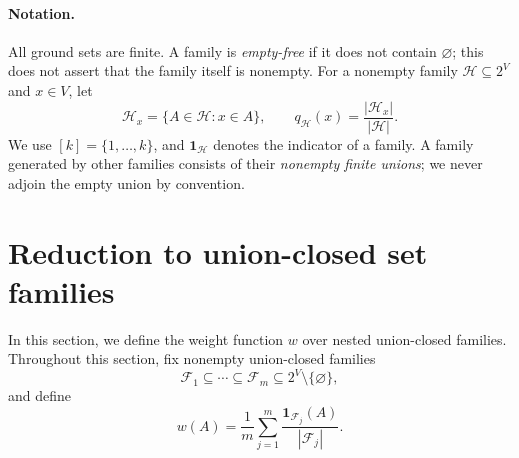 \documentclass[11pt]{article}
\newcommand{\<}{\langle}
\renewcommand{\>}{\rangle}
\newcommand{\F}{\mathcal{F}}
\newcommand{\Hh}{\mathcal{H}}
\numberwithin{equation}{section}
\begin{document}
\paragraph{Notation.}
All ground sets are finite. A family is \emph{empty-free} if it does not
contain $\varnothing$; this does not assert that the family itself is nonempty.
For a nonempty family $\Hh\subseteq2^V$ and $x\in V$, let
\[
 \Hh_x=\{A\in\Hh:x\in A\},\qquad
 q_{\Hh}(x)=\frac{|\Hh_x|}{|\Hh|}.
\]
We use $[k]=\{1,\ldots,k\}$, and $\mathbf{1}_{\Hh}$ denotes the indicator of a
family. A family generated by other families consists of their
\emph{nonempty finite unions}; we never adjoin the empty union by convention.

\section{Reduction to union-closed set families}\label{sec:reduction_to_union_closed_families}
In this section, we define the weight function $w$ over nested union-closed families. Throughout this section, fix nonempty union-closed families
\[
 \F_1\subseteq\cdots\subseteq\F_m\subseteq2^V\setminus\{\varnothing\},
\]
and define
\begin{equation}\label{eq:mixture}
 w(A)=\frac1m\sum_{j=1}^m\frac{\mathbf{1}_{\F_j}(A)}{|\F_j|}.
\end{equation}
\end{document}
